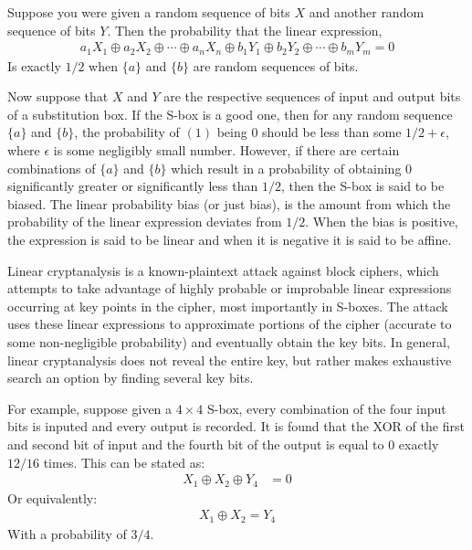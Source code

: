 \documentclass[12pt, a4paper, draft]{report}
\begin{document}
Suppose you were given a random sequence of bits $X$ and another random
sequence of bits $Y$. Then the probability that the linear expression,
\begin{align}
    a_1X_1 \oplus a_2X_2 \oplus \cdots \oplus a_nX_n \oplus
    b_1Y_1 \oplus b_2Y_2 \oplus \cdots \oplus b_mY_m = 0
\end{align}
Is exactly $1/2$ when $\{a\}$ and $\{b\}$ are random sequences of bits.

Now suppose that $X$ and $Y$ are the respective sequences of input and
output bits of a substitution box. If the S-box is a good one, then
for any random sequence $\{a\}$ and $\{b\}$, the probability of $(1)$
being $0$ should be less than some $1/2 + \epsilon$, where $\epsilon$ is
some negligibly small number. However, if there are certain combinations
of $\{a\}$ and $\{b\}$ which result in a probability of obtaining $0$
significantly greater or significantly less than $1/2$, then the S-box
is said to be biased. The linear probability bias (or just bias), is the
amount from which the probability of the linear expression deviates from
$1/2$. When the bias is positive, the expression is said to be linear
and when it is negative it is said to be affine.

Linear cryptanalysis is a known-plaintext attack against block ciphers,
which attempts to take advantage of highly probable or improbable linear
expressions occurring at key points in the cipher, most importantly in
S-boxes. The attack uses these linear expressions to approximate portions
of the cipher (accurate to some non-negligible probability) and eventually
obtain the key bits. In general, linear cryptanalysis does not reveal the
entire key, but rather makes exhaustive search an option by finding several
key bits.

For example, suppose given a $4 \times 4$ S-box, every combination
of the four input bits is inputed and every output is recorded.
It is found that the XOR of the first and second bit of input and the
fourth bit of the output is equal to $0$ exactly $12/16$ times.
This can be stated as:
\begin{align*}
    X_1 \oplus X_2 \oplus Y_4 & = 0
\end{align*}
Or equivalently:
\begin{align*}
    X_1 \oplus X_2 = Y_4
\end{align*}
With a probability of $3/4$.
\end{document}
